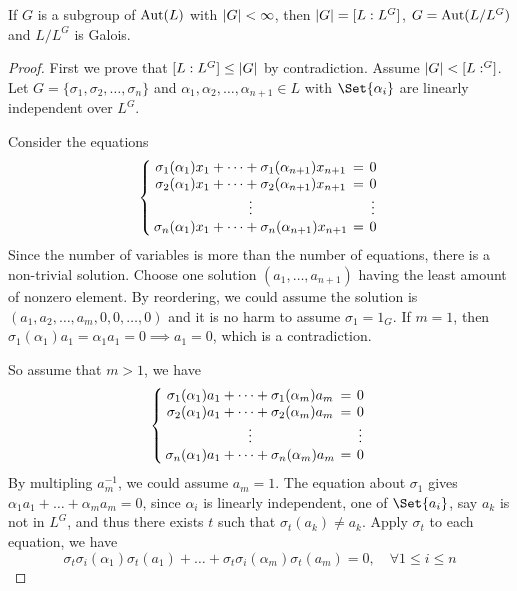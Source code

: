 \begin{theorem} \label{thm:extension-of-fix-field-is-galois}
  If $G$ is a subgroup of $\operatorname{Aut}(L)$ with $\lvert G\rvert < \infty$, then $\lvert G\rvert = [L: L^G]$,
  $G = \operatorname{Aut}(L / L^G)$ and $L / L^G$ is Galois.

  \begin{proof}
    First we prove that $[L: L^G] \leq \lvert G\rvert$ by contradiction.
    Assume $\lvert G\rvert < [L: ^G]$. \\
    Let $G = \{\sigma_1, \sigma_2, \dots, \sigma_n\}$ and $\alpha_1, \alpha_2, \dots, \alpha_{n+1} \in L$
    with $\Set{\alpha_i}$ are linearly independent over $L^G$.

    Consider the equations
    \[
      \left\{
        \arraycolsep=2pt
        \begin{array}{ccc}
          \sigma_1(\alpha_1) x_1 + \dots + \sigma_1(\alpha_{n+1}) x_{n+1} &=& 0 \\
          \sigma_2(\alpha_1) x_1 + \dots + \sigma_2(\alpha_{n+1}) x_{n+1} &=& 0 \\
          \vdots & & \vdots \\
          \sigma_n(\alpha_1) x_1 + \dots + \sigma_n(\alpha_{n+1}) x_{n+1} &=& 0 \\
        \end{array}
      \right.
    \]
    Since the number of variables is more than the number of equations, there is a
    non-trivial solution. Choose one solution $(a_1, \dots, a_{n+1})$ having the
    least amount of nonzero element. By reordering, we could assume
    the solution is $(a_1, a_2, \dots, a_m, 0, 0, \dots, 0)$ and it is no harm to assume $\sigma_1 = 1_G$.
    If $m = 1$, then $\sigma_1(\alpha_1) a_1 = \alpha_1 a_1 = 0 \implies a_1 = 0$,
    which is a contradiction.

    So assume that $m > 1$, we have
    \[
      \left\{
        \arraycolsep=2pt
        \begin{array}{ccc}
          \sigma_1(\alpha_1) a_1 + \dots + \sigma_1(\alpha_{m}) a_{m} &=& 0 \\
          \sigma_2(\alpha_1) a_1 + \dots + \sigma_2(\alpha_{m}) a_{m} &=& 0 \\
          \vdots & & \vdots \\
          \sigma_n(\alpha_1) a_1 + \dots + \sigma_n(\alpha_{m}) a_{m} &=& 0 \\
        \end{array}
      \right.
    \]
    By multipling $a_m^{-1}$, we could assume $a_m = 1$. The equation about $\sigma_1$ gives
    $\alpha_1 a_1 + \dots + \alpha_m a_m = 0$, since $\alpha_i$ is linearly independent,
    one of $\Set{a_i}$, say $a_k$ is not in $L^G$, and thus there exists $t$
    such that $\sigma_t(a_k) \neq a_k$. Apply $\sigma_t$ to each equation, we have
    \[ \sigma_t\sigma_i(\alpha_1) \sigma_t(a_1) + \dots + \sigma_t \sigma_i(\alpha_m) \sigma_t(a_m) = 0,\quad
      \forall 1 \leq i \leq n \]


\end{proof}
\end{theorem}
